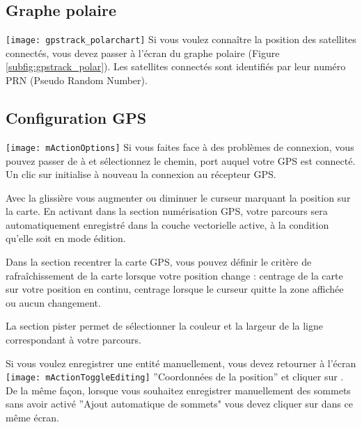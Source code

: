 \subsection{Graphe polaire}
\texttt{[image: gpstrack\_polarchart]} Si vous voulez connaître la position des satellites connectés, vous devez passer à l'écran du graphe polaire (Figure \ref{subfig:gpstrack_polar}).
Les satellites connectés sont identifiés par leur numéro PRN (Pseudo Random Number).

\subsection{Configuration GPS}
\texttt{[image: mActionOptions]} Si vous faites face à des problèmes de connexion, vous pouvez passer de  à  et sélectionnez le chemin, port auquel votre GPS est connecté. 
Un clic sur  initialise à nouveau la connexion au récepteur GPS.

Avec la glissière  vous augmenter ou diminuer le curseur marquant la position sur la carte. En activant  dans la section numérisation GPS, votre parcours sera automatiquement enregistré dans la couche vectorielle active, à la condition qu'elle soit en mode édition. 

Dans la section recentrer la carte GPS, vous pouvez définir le critère de rafraîchissement de la carte lorsque votre position change : centrage de la carte sur votre position en continu, centrage lorsque le curseur quitte la zone affichée ou aucun changement. 

La section pister permet de sélectionner la couleur et la largeur de la ligne correspondant à votre parcours.

Si vous voulez enregistrer une entité manuellement, vous devez retourner à l'écran \texttt{[image: mActionToggleEditing]} ''Coordonnées de la position'' et cliquer sur . De la même façon, lorsque vous souhaitez enregistrer manuellement des sommets sans avoir activé ''Ajout automatique de sommets"  vous devez cliquer sur  dans ce même écran.

\FloatBarrier
